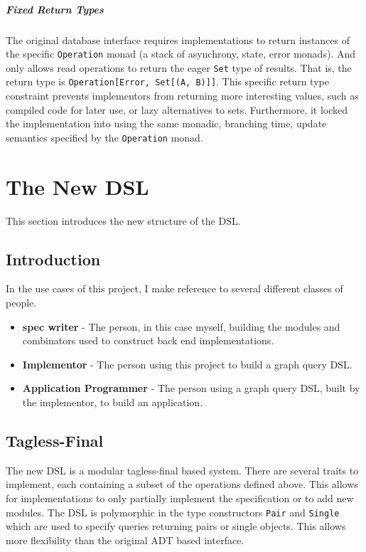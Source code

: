 \documentclass{report}
\newcommand \2[0]{\textbf{2}}
\newcommand \3[0]{\textbf{3}}
\begin{document}
\paragraph{Fixed Return Types}
The original database interface requires implementations to return instances of the specific \texttt{Operation} monad (a stack of asynchrony, state, error monads). And only allows read operations to return the eager \texttt{Set} type of results. That is, the return type is \texttt{Operation[Error, Set[(A, B)]]}. This specific return type constraint prevents implementors from returning more interesting values, such as compiled code for later use, or lazy alternatives to sets. Furthermore, it locked the implementation into using the same monadic, branching time, update semantics specified by the \texttt{Operation} monad.


\chapter{The New DSL}
This section introduces the new structure of the DSL.

\section{Introduction}
In the use cases of this project, I make reference to several different classes of people.

\begin{itemize}
    \item \textbf{spec writer} - The person, in this case myself, building the modules and combinators used to construct back end implementations.
    \item \textbf{Implementor} - The person using this project to build a graph query DSL.
    \item \textbf{Application Programmer} - The person using a graph query DSL, built by the implementor, to build an application.

\end{itemize}
 
\section{Tagless-Final}
The new DSL is a modular tagless-final based system. There are several traits to implement, each containing a subset of the operations defined above. This allows for implementations to only partially implement the specification or to add new modules.
The DSL is polymorphic in the type constructors \texttt{Pair} and \texttt{Single} which are used to specify queries returning pairs or single objects. This allows more flexibility than the original ADT based interface.
\end{document}

